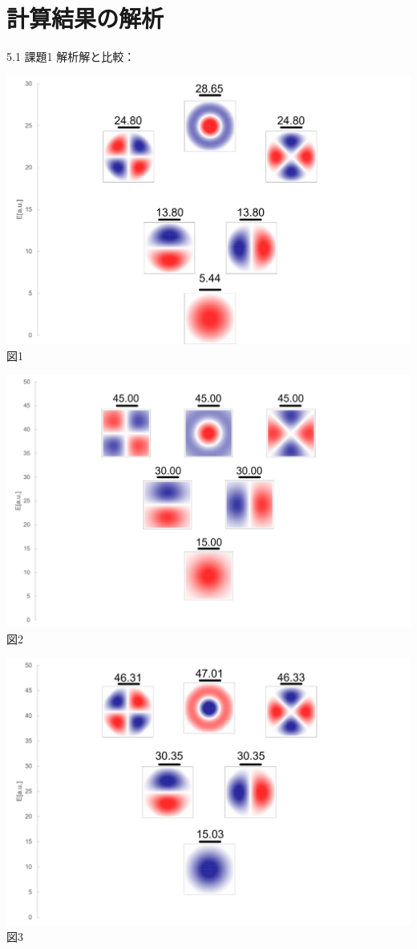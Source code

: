 \documentclass{beamer}
\begin{document}
\section{計算結果の解析}
\begin{frame}{5.1 課題1}
解析解と比較：

\begin{multicols}{3}
\includegraphics[width=\linewidth]{images/円筒準位図.png}
\centering 図1

\includegraphics[width=\linewidth]{images/調和準位図.png}
\centering 図2

\includegraphics[width=\linewidth]{images/ハイブリッド準位図.png}
\centering 図3
\end{multicols}
\end{frame}
\end{document}
